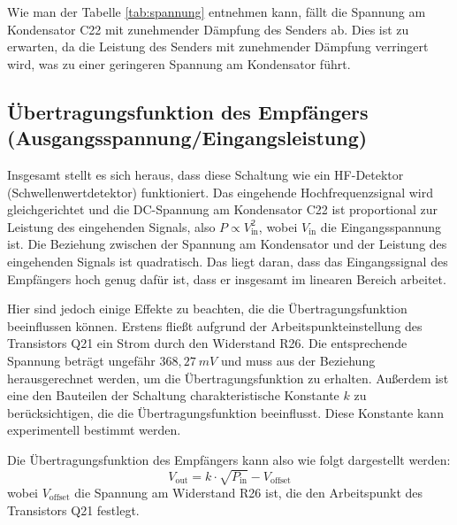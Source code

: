 Wie man der Tabelle \ref{tab:spannung} entnehmen kann, fällt die Spannung am Kondensator C22 mit zunehmender Dämpfung des Senders ab. Dies ist zu erwarten, da die Leistung des Senders mit zunehmender Dämpfung verringert wird, was zu einer geringeren Spannung am Kondensator führt.

\subsection{Übertragungsfunktion des Empfängers (Ausgangsspannung/Eingangsleistung)}
Insgesamt stellt es sich heraus, dass diese Schaltung wie ein HF-Detektor (Schwellenwertdetektor) funktioniert. Das eingehende Hochfrequenzsignal wird gleichgerichtet und die DC-Spannung am Kondensator C22 ist proportional zur Leistung des eingehenden Signals,
also \( P \propto V_\text{in}^2 \), wobei \( V_\text{in} \) die Eingangsspannung ist. Die Beziehung zwischen der Spannung am Kondensator und der Leistung des eingehenden Signals ist quadratisch. Das liegt daran, dass das Eingangssignal des Empfängers hoch genug dafür ist, dass er insgesamt im linearen Bereich arbeitet. 

Hier sind jedoch einige Effekte zu beachten, die die Übertragungsfunktion beeinflussen können. Erstens fließt aufgrund der Arbeitspunkteinstellung des Transistors Q21 ein Strom durch den Widerstand R26. Die entsprechende Spannung beträgt ungefähr $368,27~mV$ und muss aus der Beziehung herausgerechnet werden, um die Übertragungsfunktion zu erhalten. Außerdem ist eine den Bauteilen der Schaltung charakteristische Konstante \( k \) zu berücksichtigen, die die Übertragungsfunktion beeinflusst. Diese Konstante kann experimentell bestimmt werden.

Die Übertragungsfunktion des Empfängers kann also wie folgt dargestellt werden:
\begin{equation}
    V_\text{out} = k \cdot \sqrt{P_\text{in}} - V_\text{offset}
\end{equation}
wobei \( V_\text{offset} \) die Spannung am Widerstand R26 ist, die den Arbeitspunkt des Transistors Q21 festlegt. 

